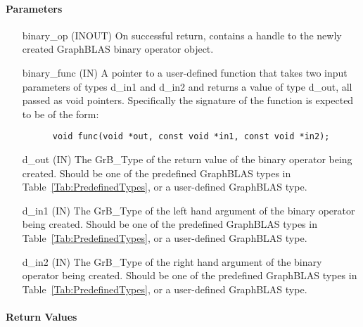 \paragraph{Parameters}

\begin{itemize}[leftmargin=1.1in]
    \item[{\sf binary\_op}] ({\sf INOUT}) On successful return, contains a 
          handle to the newly created GraphBLAS binary operator object.
    \item[{\sf binary\_func}] ({\sf IN}) A pointer to a user-defined function that 
          takes two input parameters of types {\sf d\_in1} and {\sf d\_in2} and returns a value of
		type {\sf d\_out}, all passed as {\sf void} pointers.
          Specifically the signature of the function is expected to 
          be of the form:
      \begin{verbatim}
      void func(void *out, const void *in1, const void *in2);
      \end{verbatim}
    \item[{\sf d\_out}]  ({\sf IN}) The {\sf GrB\_Type} of the return
          value of the binary operator being created. Should be one of the
          predefined GraphBLAS types in Table~\ref{Tab:PredefinedTypes}, or a 
          user-defined GraphBLAS type.
    \item[{\sf d\_in1}]  ({\sf IN}) The {\sf GrB\_Type} of the left hand 
          argument of the binary operator being created. Should be one of the
          predefined GraphBLAS types in Table~\ref{Tab:PredefinedTypes}, or a
          user-defined GraphBLAS type.
    \item[{\sf d\_in2}]  ({\sf IN}) The {\sf GrB\_Type} of the right hand 
          argument of the binary operator being created. Should be one of the
          predefined GraphBLAS types in Table~\ref{Tab:PredefinedTypes}, or a 
          user-defined GraphBLAS type.
\end{itemize}

\paragraph{Return Values}

